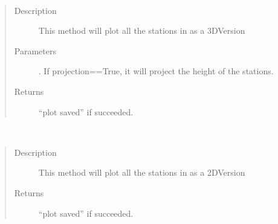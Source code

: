 \documentclass[letterpaper,10pt,english]{sphinxmanual}
\begin{document}
\begin{fulllineitems}
\begin{fulllineitems}
\begin{quote}
\begin{description}
\begin{itemize}
\end{itemize}

\end{description}\end{quote}

\end{fulllineitems}


\begin{fulllineitems}
\label{\detokenize{DwdPlotter:DwdPlotter.PlotterForStations.plotting_3d}}~\begin{quote}\begin{description}
\item[{Description}] \leavevmode
\sphinxAtStartPar
This method will plot all the stations in as a 3D\sphinxhyphen{}Version

\item[{Parameters}] \leavevmode
\sphinxAtStartPar
{} \textendash{} . If projection==True, it will project the height of the stations.

\item[{Returns}] \leavevmode
\sphinxAtStartPar
“plot saved” if succeeded.

\end{description}\end{quote}

\end{fulllineitems}


\begin{fulllineitems}
\label{\detokenize{DwdPlotter:DwdPlotter.PlotterForStations.plotting_height_2d}}~\begin{quote}\begin{description}
\item[{Description}] \leavevmode
\sphinxAtStartPar
This method will plot all the stations in as a 2D\sphinxhyphen{}Version

\item[{Returns}] \leavevmode
\sphinxAtStartPar
“plot saved” if succeeded.

\end{description}\end{quote}

\end{fulllineitems}


\end{fulllineitems}
\end{document}
